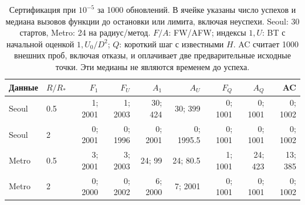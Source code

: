 \begin{table}[htbp]
\centering\footnotesize
\setlength{\tabcolsep}{4pt}
\caption{Сертификация при $10^{-5}$ за 1000 обновлений. В ячейке указаны число успехов и медиана вызовов функции до остановки или лимита, включая неуспехи. Seoul: 30 стартов, Metro: 24 на радиус/метод. $F/A$: FW/AFW; индексы $1,U$: BT с начальной оценкой $1,U_0/D^2$; $Q$: короткий шаг с известными $H$. AC считает 1000 внешних проб, включая отказы, и оплачивает две предварительные исходные точки. Эти медианы не являются временем до успеха.}
\label{tab:counts}
\begin{tabular}{llrrrrrrr}
\toprule
Данные & $R/R_*$ & $F_1$ & $F_U$ & $A_1$ & $A_U$ & $F_Q$ & $A_Q$ & AC \\
\midrule
Seoul & 0.5 & 1; 2001 & 1; 2003 & 30; 424 & 30; 399 & 0; 1001 & 0; 1001 & 0; 1002 \\
Seoul & 2 & 0; 2001 & 0; 1996 & 0; 2001 & 0; 1995.5 & 0; 1001 & 0; 1001 & 0; 1002 \\
Metro & 0.5 & 3; 2001 & 3; 2003 & 24; 99 & 24; 80.5 & 1; 1001 & 24; 423 & 13; 385 \\
Metro & 2 & 0; 2000 & 0; 2002 & 6; 2000 & 7; 2001 & 0; 1001 & 0; 1001 & 0; 1002 \\
\bottomrule
\end{tabular}
\end{table}
